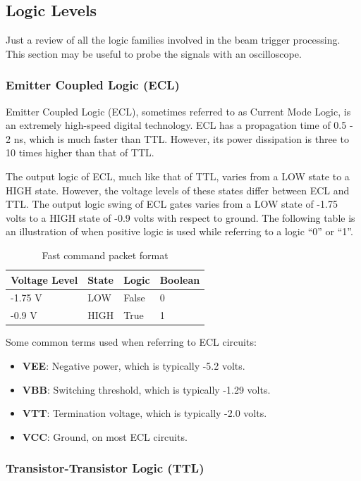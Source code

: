 \subsection{Logic Levels}
Just a review of all the logic families involved in the beam trigger processing.
This section may be useful to probe the signals with an oscilloscope.
\subsubsection{Emitter Coupled Logic (ECL)}
Emitter Coupled Logic (ECL), sometimes referred to as Current Mode Logic, is an
extremely high-speed digital technology. ECL has a propagation time of 0.5 - 2
ns, which is much faster than TTL. However, its power dissipation is three to 10
times higher than that of TTL.

The output logic of ECL, much like that of TTL, varies from a LOW state to a
HIGH state. However, the voltage levels of these states differ between ECL and
TTL. The output logic swing of ECL gates varies from a LOW state of -1.75 volts
to a HIGH state of -0.9 volts with respect to ground. The following table is an
illustration of when positive logic is used while referring to a logic ``0'' or
``1''.
\begin{table}[ht]
  \centering
  \begin{tabular}{l l l l}
    \hline
    \textbf{Voltage Level} & \textbf{State} & \textbf{Logic} & \textbf{Boolean}
    \\
    \hline
    -1.75 V & LOW & False & 0 \\
    -0.9 V & HIGH & True & 1 \\
    \hline
  \end{tabular}
  \caption{Fast command packet format}
\end{table}

Some common terms used when referring to ECL circuits:
\begin{itemize}
\item \textbf{VEE}: Negative power, which is typically -5.2 volts.
\item \textbf{VBB}: Switching threshold, which is typically -1.29 volts.
\item \textbf{VTT}: Termination voltage, which is typically -2.0 volts.
\item \textbf{VCC}: Ground, on most ECL circuits.
\end{itemize}

\subsubsection{Transistor-Transistor Logic (TTL)}

